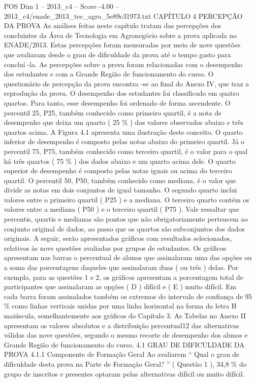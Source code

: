 \begin{textsample}{POS Dim 1 – 2013\_c4 – Score -4.00 – 2013\_c4/enade\_2013\_tec\_agro\_5e89c31973.txt}  \label{ex:f1_pos_382}
CAPÍTULO 4 PERCEPÇÃO DA PROVA As análises feitas neste capítulo tratam das percepções dos concluintes da Área de Tecnologia em Agronegócio sobre a prova aplicada no ENADE/2013.
Estas percepções foram mensuradas por meio de nove questões que avaliaram desde o grau de dificuldade da prova até o tempo gasto para concluí -la.
As percepções sobre a prova foram relacionadas com o desempenho dos estudantes e com a Grande Região de funcionamento do curso.
O questionário de percepção da prova encontra -se ao final do Anexo IV, que traz a reprodução da prova.
O desempenho dos estudantes foi classificado em quatro quartos.
Para tanto, esse desempenho foi ordenado de forma ascendente.
O percentil 25, P25, também conhecido como primeiro quartil, é a nota de desempenho que deixa um quarto ( 25 \% ) dos valores observados abaixo e três quartos acima.
A Figura 4.1 apresenta uma ilustração deste conceito.
O quarto inferior de desempenho é composto pelas notas abaixo do primeiro quartil.
Já o percentil 75, P75, também conhecido como terceiro quartil, é o valor para o qual há três quartos ( 75 \% ) dos dados abaixo e um quarto acima dele.
O quarto superior de desempenho é composto pelas notas iguais ou acima do terceiro quartil.
O percentil 50, P50, também conhecido como mediana, é o valor que divide as notas em dois conjuntos de igual tamanho.
O segundo quarto inclui valores entre o primeiro quartil ( P25 ) e a mediana.
O terceiro quarto contém os valores entre a mediana ( P50 ) e o terceiro quartil ( P75 ).
Vale ressaltar que percentis, quartis e medianas são pontos que não obrigatoriamente pertencem ao conjunto original de dados, ao passo que os quartos são subconjuntos dos dados originais.
A seguir, serão apresentados gráficos com resultados selecionados, relativos às nove questões avaliadas por grupos de estudantes.
Os gráficos apresentam nas barras o percentual de alunos que assinalaram uma das opções ou a soma das porcentagens daqueles que assinalaram duas ( ou três ) delas.
Por exemplo, para as questões 1 e 2, os gráficos apresentam a porcentagem total de participantes que assinalaram as opções ( D ) difícil e ( E ) muito difícil.
Em cada barra foram assinalados também os extremos do intervalo de confiança de 95 \% como linhas verticais unidas por uma linha horizontal na forma da letra H maiúscula, semelhantemente aos gráficos do Capítulo 3.
As Tabelas no Anexo II apresentam os valores absolutos e a distribuição percentual12 das alternativas válidas das nove questões, segundo o mesmo recorte de desempenho dos alunos e Grande Região de funcionamento do curso. 4.1 GRAU DE DIFICULDADE DA PROVA 4.1.1 Componente de Formação Geral Ao avaliarem “ Qual o grau de dificuldade desta prova na Parte de Formação Geral? ” ( Questão 1 ), 34,8 \% do grupo de inscritos e presentes optaram pelas alternativas difícil ou muito difícil.

\end{textsample}
